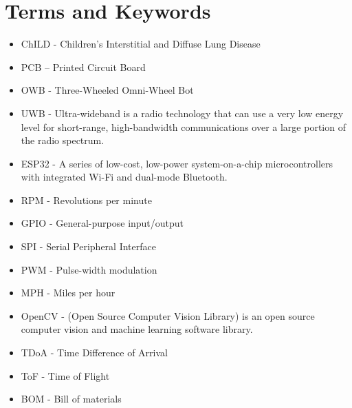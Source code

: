 \documentclass{report}
\begin{document}
    \section{Terms and Keywords}
    \begin{itemize}
        \item ChILD - Children's Interstitial and Diffuse Lung Disease
        \item PCB – Printed Circuit Board
        \item OWB - Three-Wheeled Omni-Wheel Bot
        \item UWB - Ultra-wideband is a radio technology that can use a very low energy level for short-range, high-bandwidth communications over a large portion of the radio spectrum.
        \item ESP32 - A series of low-cost, low-power system-on-a-chip microcontrollers with integrated Wi-Fi and dual-mode Bluetooth.
        \item RPM - Revolutions per minute
        \item GPIO - General-purpose input/output
        \item SPI - Serial Peripheral Interface
        \item PWM - Pulse-width modulation
        \item MPH - Miles per hour
        \item OpenCV - (Open Source Computer Vision Library) is an open source computer vision and machine learning software library.
        \item TDoA - Time Difference of Arrival 
        \item ToF - Time of Flight
        \item BOM - Bill of materials
    \end{itemize}

    
    
\end{document}
